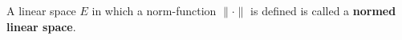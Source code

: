 A linear space $E$ in which a norm-function $\|\cdot\|$ is defined is called a \textbf{normed linear space}.
